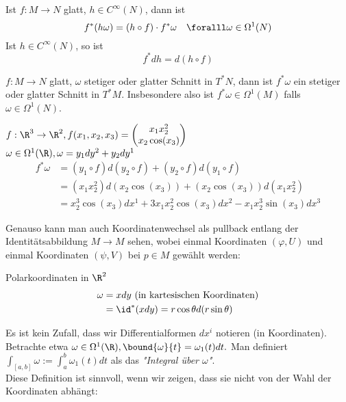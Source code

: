 \begin{prop}
	Ist $ f: M \to N $ glatt, $h \in C^\infty(N)$, dann ist
	\[ f^*(h\omega) = (h \circ f) \cdot f^*\omega\quad \foralll \omega \in \Omega^1(N) \]
	Ist $h \in C^\infty(N)$, so ist
	\[ f^*dh = d(h \circ f) \]
\end{prop}

\begin{cor*}
	$ f: M \to N $ glatt, $\omega$ stetiger oder glatter Schnitt in $T^*N$, dann ist $f^*\omega$ ein stetiger oder glatter Schnitt in $T^*M$. Insbesondere also ist $f^*\omega \in \Omega^1(M)$ falls $\omega \in \Omega^1(N)$.
\end{cor*}

\begin{exmp*}
	$ f: \R^3 \to \R^2, f(x_1,x_2,x_3) = \begin{pmatrix}
		x_1x_2^2\\ x_2 \cos(x_3)
	\end{pmatrix} $\\
	$ \omega \in \Omega^1(\R), \omega = y_1dy^2 + y_2dy^1 $
	\begin{align*}
		f^*\omega &= (y_1 \circ f)d(y_2 \circ f) + (y_2 \circ f)d(y_1 \circ f)\\
		&=(x_1x_2^2)d(x_2\cos(x_3)) + (x_2\cos(x_3))d(x_1x_2^2)\\
		&= x_2^3\cos(x_3)dx^1 + 3x_1x_2^2\cos(x_3)dx^2 - x_1x_2^3\sin(x_3)dx^3
	\end{align*}
\end{exmp*}

\begin{rem*}
	Genauso kann man auch Koordinatenwechsel als pullback entlang der Identitätsabbildung $M \to M$ sehen, wobei einmal Koordinaten $(\varphi,U)$ und einmal Koordinaten $(\psi,V)$ bei $p \in M$ gewählt werden:
\end{rem*}

\begin{exmp*}
	Polarkoordinaten in $\R^2$
	\begin{align*}		
		\omega &= xdy \ \text{(in kartesischen Koordinaten)}\\
		&= \id^*(xdy) = r\cos\theta d(r\sin\theta)
	\end{align*}
\end{exmp*}

Es ist kein Zufall, dass wir Differentialformen $dx^i$ notieren (in Koordinaten). Betrachte etwa $ \omega \in \Omega^1(\R), \bound{\omega}{t} = \omega_1(t)dt. $ Man definiert $ \int_{[a,b]}\omega := \int_a^b \omega_1(t)dt $ als das \emph{"Integral über $\omega$"}.\\
Diese Definition ist sinnvoll, wenn wir zeigen, dass sie nicht von der Wahl der Koordinaten abhängt:

